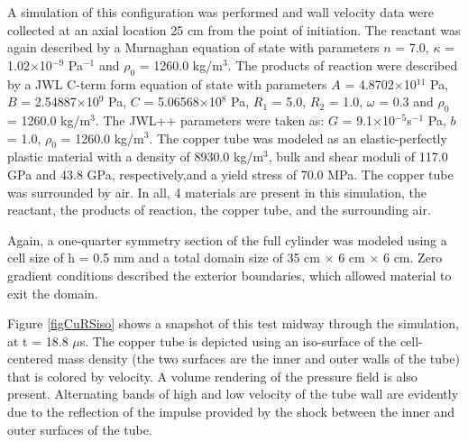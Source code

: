 A simulation of this configuration was performed and wall velocity data were 
collected at an axial location 25 cm from the point of initiation.  The 
reactant was again described by a Murnaghan equation of state with parameters 
$n$ = 7.0, $\kappa$ = 1.02$\times$10$^{-9}$ Pa$^{-1}$ and $\rho_0$ = 1260.0 kg/m$^3$.  The products 
of reaction were described by a JWL C-term form  equation of state with 
parameters $A$ = 4.8702$\times$10$^{11}$ Pa, $B$ = 2.54887$\times$10$^9$ Pa, $C$ = 5.06568$\times$10$^8$ Pa, 
$R_1$ = 5.0, $R_2$ = 1.0, $\omega$ = 0.3 and $\rho_0$ = 1260.0 kg/m$^3$.
The JWL++ parameters were taken as: $G$ = 9.1$\times$10$^{-5}$s$^{-1}$ Pa, $b$ = 1.0,
$\rho_0$ = 1260.0 kg/m$^3$.  The copper tube was modeled as an elastic-perfectly 
plastic material with a density of 8930.0 kg/m$^3$, bulk and shear moduli of 
117.0 GPa and 43.8 GPa, respectively,and a yield stress of 70.0 MPa.
The copper tube was surrounded by air.  In all, 4 materials are present in
this simulation, the reactant, the products of reaction, the copper tube, and 
the surrounding air.

Again, a one-quarter symmetry section of the full cylinder was modeled using 
a cell size of h = 0.5 mm and a total domain size of 
35 cm $\times$ 6 cm $\times$ 6 cm.  Zero gradient conditions described the 
exterior boundaries, which allowed material to exit the domain.

Figure \ref{figCuRSiso} shows a snapshot of this test midway through the 
simulation, at t = 18.8 $\mu$s.  The copper tube is depicted using an 
iso-surface of the cell-centered mass density (the two surfaces are the 
inner and outer walls of the tube) that is colored by velocity.  A volume 
rendering of the pressure field is also present.  Alternating bands of high 
and low velocity of the tube wall are evidently due to the reflection of the 
impulse provided by the shock between the inner and outer surfaces of the tube.

